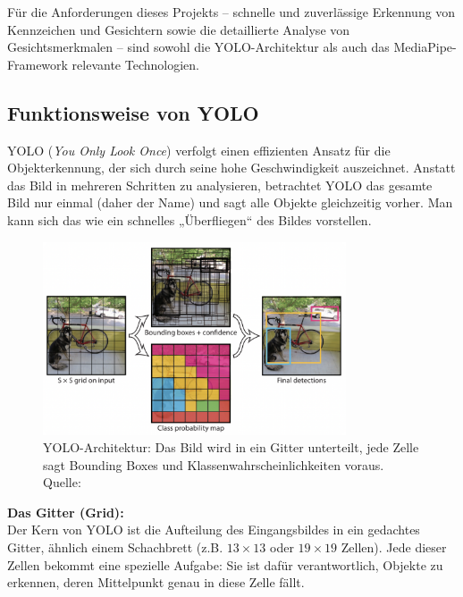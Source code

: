 Für die Anforderungen dieses Projekts – schnelle und zuverlässige Erkennung von Kennzeichen und Gesichtern sowie die detaillierte Analyse von Gesichtsmerkmalen – sind sowohl die YOLO-Architektur als auch das MediaPipe-Framework relevante Technologien.

\subsection{Funktionsweise von YOLO}

YOLO (\textit{You Only Look Once}) verfolgt einen effizienten Ansatz für die Objekterkennung, der sich durch seine hohe Geschwindigkeit auszeichnet. Anstatt das Bild in mehreren Schritten zu analysieren, betrachtet YOLO das gesamte Bild nur einmal (daher der Name) und sagt alle Objekte gleichzeitig vorher. Man kann sich das wie ein schnelles „Überfliegen“ des Bildes vorstellen.

\begin{figure}[htbp]
    \centering
    \includegraphics[width=0.8\textwidth]{data/yolo_grid.png}
    \caption{YOLO-Architektur: Das Bild wird in ein Gitter unterteilt, jede Zelle sagt Bounding Boxes und Klassenwahrscheinlichkeiten voraus. Quelle: \cite{yolo_grid}}
    \label{fig:yolo_grid}
\end{figure}

\textbf{Das Gitter (Grid):} \\
Der Kern von YOLO ist die Aufteilung des Eingangsbildes in ein gedachtes Gitter, ähnlich einem Schachbrett (z.B. $13 \times 13$ oder $19 \times 19$ Zellen). Jede dieser Zellen bekommt eine spezielle Aufgabe: Sie ist dafür verantwortlich, Objekte zu erkennen, deren Mittelpunkt genau in diese Zelle fällt.

